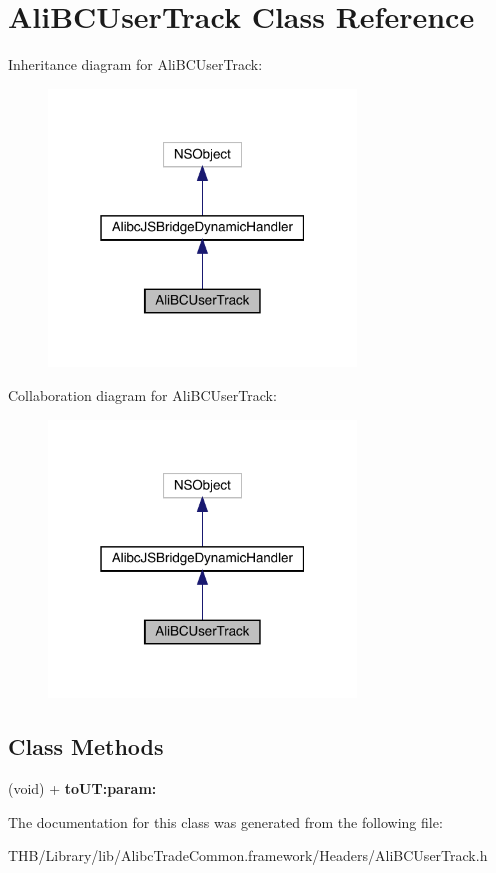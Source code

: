 \hypertarget{interface_ali_b_c_user_track}{}\section{Ali\+B\+C\+User\+Track Class Reference}
\label{interface_ali_b_c_user_track}


Inheritance diagram for Ali\+B\+C\+User\+Track\+:\nopagebreak
\begin{figure}[H]
\begin{center}
\leavevmode
\includegraphics[width=232pt]{interface_ali_b_c_user_track__inherit__graph}
\end{center}
\end{figure}


Collaboration diagram for Ali\+B\+C\+User\+Track\+:\nopagebreak
\begin{figure}[H]
\begin{center}
\leavevmode
\includegraphics[width=232pt]{interface_ali_b_c_user_track__coll__graph}
\end{center}
\end{figure}
\subsection*{Class Methods}
\begin{DoxyCompactItemize}
\item 
\mbox{\label{interface_ali_b_c_user_track_a773bfea21716e710fff21998ca803abb}} 
(void) + {\bfseries to\+U\+T\+:param\+:}
\end{DoxyCompactItemize}


The documentation for this class was generated from the following file\+:\begin{DoxyCompactItemize}
\item 
T\+H\+B/\+Library/lib/\+Alibc\+Trade\+Common.\+framework/\+Headers/Ali\+B\+C\+User\+Track.\+h\end{DoxyCompactItemize}

